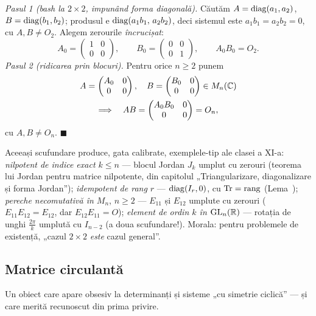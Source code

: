\emph{Pasul 1 (bash la $2\times2$, impunând forma diagonală).} Căutăm $A=\operatorname{diag}(a_1,a_2)$, $B=\operatorname{diag}(b_1,b_2)$; produsul e $\operatorname{diag}(a_1b_1,\,a_2b_2)$, deci sistemul este $a_1b_1=a_2b_2=0$, cu $A,B\neq O_2$. Alegem zerourile \emph{încrucișat}:
\[
A_0=\begin{pmatrix}1&0\\0&0\end{pmatrix},\qquad
B_0=\begin{pmatrix}0&0\\0&1\end{pmatrix},\qquad
A_0B_0=O_2 .
\]
\emph{Pasul 2 (ridicarea prin blocuri).} Pentru orice $n\ge2$ punem
\[
\begin{gathered}
A=\begin{pmatrix}A_0&0\\0&0\end{pmatrix},\quad
B=\begin{pmatrix}B_0&0\\0&0\end{pmatrix}\in M_n(\mathbb{C})\\
\Longrightarrow\quad
AB=\begin{pmatrix}A_0B_0&0\\0&0\end{pmatrix}=O_n,
\end{gathered}
\]
cu $A,B\neq O_n$. $\blacksquare$

Aceeași scufundare produce, gata calibrate, exemplele-tip ale clasei a XI-a: \emph{nilpotent de indice exact $k\le n$} --- blocul Jordan $J_k$ umplut cu zerouri (teorema lui Jordan pentru matrice nilpotente, din capitolul „Triangularizare, diagonalizare și forma Jordan''); \emph{idempotent de rang $r$} --- $\operatorname{diag}(I_r,0)$, cu $\operatorname{Tr}=\operatorname{rang}$ (Lema~); \emph{pereche necomutativă în $M_n$}, $n\ge2$ --- $E_{11}$ și $E_{12}$ umplute cu zerouri ($E_{11}E_{12}=E_{12}$, dar $E_{12}E_{11}=O$); \emph{element de ordin $k$ în $\mathrm{GL}_n(\mathbb{R})$} --- rotația de unghi $\frac{2\pi}k$ umplută cu $I_{n-2}$ (a doua scufundare!). Morala: pentru problemele de existență, „cazul $2\times2$ \emph{este} cazul general''.

\subsection{Matrice circulantă}

Un obiect care apare obsesiv la determinanți și sisteme „cu simetrie ciclică'' --- și care merită recunoscut din prima privire.

